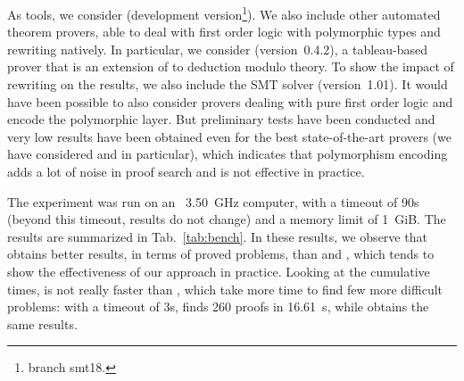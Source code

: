 As tools, we consider \archsat{} (development version\footnote{\git{}
branch smt18.}). We also include other automated theorem provers, able to
deal with first order logic with polymorphic types and rewriting natively. In
particular, we consider \zenm{} (version~0.4.2), a tableau-based prover that
is an extension of \zenon{} to deduction modulo theory. To show the impact of
rewriting on the results, we also include the \altergo{} SMT solver
(version~1.01). It would have been possible to also consider provers dealing
with pure first order logic and encode the polymorphic layer. But preliminary
tests have been conducted and very low results have been obtained even for the
best state-of-the-art provers (we have considered \e{} and \cvc{} in
particular), which indicates that polymorphism encoding adds a lot of noise
in proof search and is not effective in practice.

The experiment was run on an \intel{}~3.50~GHz computer, with a timeout of 90s
(beyond this timeout, results do not change) and a memory limit of 1~GiB. The
results are summarized in Tab.~\ref{tab:bench}. In these results, we observe
that \archsat{} obtains better results, in terms of proved problems, than
\zenm{} and \altergo{}, which tends to show the effectiveness of our approach in
practice. Looking at the cumulative times, \altergo{} is not really faster than
\archsat{}, which take more time to find few more difficult
problems: with a timeout of 3s, \archsat{} finds 260 proofs in 16.61~s,
while \altergo{} obtains the same results.

\setlength{\tabcolsep}{3pt}
\renewcommand{\arraystretch}{1.2}

